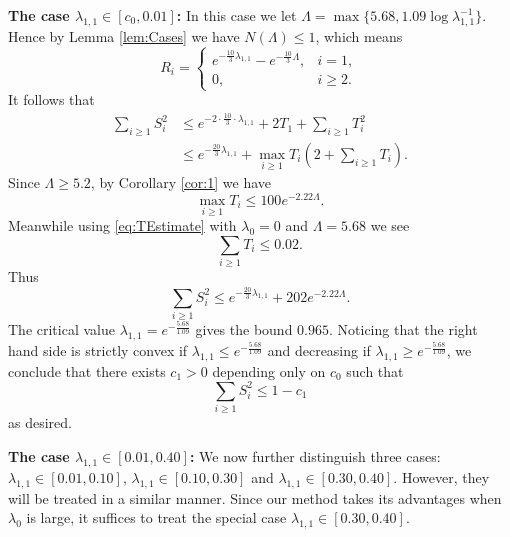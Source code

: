 \documentclass[10pt, reqno]{amsart}
\numberwithin{equation}{section}
\newcommand{\bb}[1]{\left(#1\right)}
\begin{document}
\textbf{The case $\lambda_{1,1}\in [c_0,0.01]$:}
In this case we let $\Lambda=\max \{5.68,1.09\log \lambda_{1,1}^{-1}\}$. Hence by Lemma \ref{lem:Cases} we have $N(\Lambda)\leq 1$, which means
\begin{equation}\label{eq:RiCase1}
R_i=\begin{cases}
e^{-\frac{10}{3}\lambda_{1,1}}-e^{-\frac{10}{3}\Lambda},& i=1, \\
0, &i\geq 2.
\end{cases}
\end{equation}
It follows that
\begin{equation}\label{eq:SumSquaresCase1}
\begin{split}
\sum_{i\geq 1}S_i^2&\leq e^{-2\cdot \frac{10}{3}\cdot \lambda_{1,1}}+2T_1+\sum_{i\geq 1} T_i^2 \\
&\leq e^{-\frac{20}{3}\lambda_{1,1}}+\max_{i\geq 1}T_i \bb{2+\sum_{i\geq 1}T_i}.
\end{split}
\end{equation}
Since $\Lambda\geq 5.2$, by Corollary \ref{cor:1} we have
\begin{equation}\label{eq:MaxTi}
\max_{i\geq 1}T_i\leq 100e^{-2.22\Lambda}.
\end{equation}
Meanwhile using \eqref{eq:TEstimate} with $\lambda_0=0$ and $\Lambda=5.68$ we see
\begin{equation}\label{eq:SumTi}
\sum_{i\geq 1}T_i\leq 0.02.
\end{equation}
Thus
\begin{equation}\label{eq:FinalBoundCase1}
\sum_{i\geq 1}S_i^2\leq e^{-\frac{20}{3}\lambda_{1,1}}+202e^{-2.22 \Lambda}.
\end{equation}
The critical value $\lambda_{1,1}=e^{-\frac{5.68}{1.09}}$ gives the bound $0.965$. Noticing that the right hand side is strictly convex if $\lambda_{1,1}\leq e^{-\frac{5.68}{1.09}}$ and decreasing if $\lambda_{1,1}\geq e^{-\frac{5.68}{1.09}}$, we conclude that there exists $c_1>0$ depending only on $c_0$ such that
\begin{equation}\label{eq:FinalResultCase1}
\sum_{i\geq 1}S_i^2\leq 1-c_1
\end{equation}
as desired.

\textbf{The case $\lambda_{1,1}\in [0.01,0.40]$:}
We now further distinguish three cases: $\lambda_{1,1}\in [0.01,0.10]$, $\lambda_{1,1}\in [0.10,0.30]$ and $\lambda_{1,1}\in [0.30,0.40]$. However, they will be treated in a similar manner. Since our method takes its advantages when $\lambda_0$ is large, it suffices to treat the special case $\lambda_{1,1}\in [0.30,0.40]$.
\end{document}
